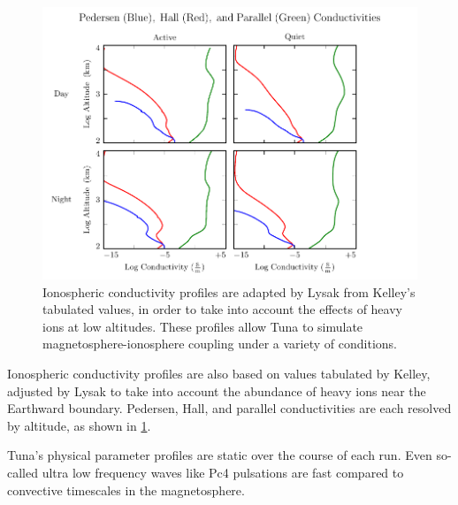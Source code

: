 
\begin{figure}[!htb]
  \centering
  \includegraphics[width=\textwidth]{figures/sigma.pdf}
  \caption[Ionospheric Conductivity Profiles]{
    Ionospheric conductivity profiles are adapted by Lysak\cite{lysak_2013}
    from Kelley's tabulated values\cite{kelley_1989}, in order to take into
    account the effects of heavy ions at low altitudes. These profiles allow
    Tuna to simulate magnetosphere-ionosphere coupling under a variety of
    conditions. 
  }
  \label{fig_sigma}
\end{figure}

Ionospheric conductivity profiles are also based on values tabulated by Kelley,
adjusted by Lysak\cite{lysak_2013} to take into account the abundance of heavy
ions near the Earthward boundary. Pedersen, Hall, and parallel conductivities
are each resolved by altitude, as shown in \cref{fig_sigma}. 

Tuna's physical parameter profiles are static over the course of each run. Even
so-called ultra low frequency waves like Pc4 pulsations are fast compared to
convective timescales in the magnetosphere. 


